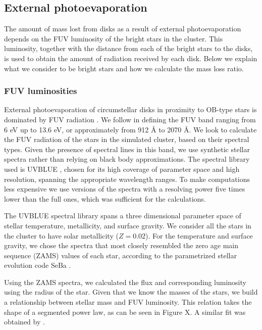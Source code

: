 \documentclass[fleqn,usenatbib]{mnras}
\begin{document}
\subsection{External photoevaporation}\label{photoevaporation}
The amount of mass lost from disks as a result of external photoevaporation depends on the FUV luminosity of the bright stars in the cluster. This luminosity, together with the distance from each of the bright stars to the disks, is used to obtain the amount of radiation received by each disk. Below we explain what we consider to be bright stars and how we calculate the mass loss ratio.


\subsubsection{FUV luminosities}\label{FUVluminosities}
External photoevaporation of circumstellar disks in proximity to OB-type stars is dominated by FUV radiation \citep[see][]{storzer1999,adams2004,pascucci2014,gorti2016,guarcello2016}. We follow \citet{adams2004} in defining the FUV band ranging from 6 eV up to 13.6 eV, or approximately from 912 Å to 2070 Å. We look to calculate the FUV radiation of the stars in the simulated cluster, based on their spectral types. Given the presence of spectral lines in this band, we use synthetic stellar spectra rather than relying on black body approximations. The spectral library used is UVBLUE \citep{rodriguez-merino2005}, chosen for its high coverage of parameter space and high resolution, spanning the appropriate wavelength ranges. To make computations less expensive we use versions of the spectra with a resolving power five times lower than the full ones, which was sufficient for the calculations. 

The UVBLUE spectral library spans a three dimensional parameter space of stellar temperature, metallicity, and surface gravity. We consider all the stars in the cluster to have solar metallicity ($Z = 0.02$). For the temperature and surface gravity, we chose the spectra that most closely resembled the zero age main sequence (ZAMS) values of each star, according to the parametrized stellar evolution code SeBa \citep{portegieszwart1996, toonen2012}.

Using the ZAMS spectra, we calculated the flux and corresponding luminosity using the radius of the star. Given that we know the masses of the stars, we build a relationship between stellar mass and FUV luminosity. This relation takes the shape of a segmented power law, as can be seen in Figure X. A similar fit was obtained by \citet{parravano2003}.
\end{document}
